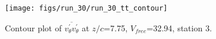 \begin{figure}[H]
\centering
\texttt{[image: figs/run\_30/run\_30\_tt\_contour]}
\caption{Contour plot of $\overline{v_{\theta}^{\prime} v_{\theta}^{\prime}}$ at $z/c$=7.75, $V_{free}$=32.94, station 3.}
\label{fig:run_30_tt_contour}
\end{figure}


